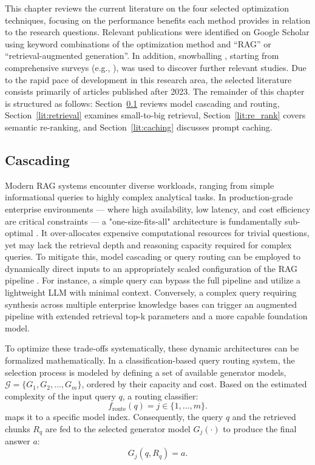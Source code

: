 This chapter reviews the current literature on the four selected optimization techniques, focusing on the performance benefits each method provides in relation to the research questions. Relevant publications were identified on Google Scholar using keyword combinations of the optimization method and ``RAG'' or ``retrieval-augmented generation''. In addition, snowballing \cite{guidelines}, starting from comprehensive surveys (e.g., \cite{gan2025rag, gao2023retrieval, wu2025ragnlp}), was used to discover further relevant studies. Due to the rapid pace of development in this research area, the selected literature consists primarily of articles published after 2023. The remainder of this chapter is structured as follows: Section~\ref{lit:cascading} reviews model cascading and routing, Section~\ref{lit:retrieval} examines small-to-big retrieval, Section~\ref{lit:re_rank} covers semantic re-ranking, and Section~\ref{lit:caching} discusses prompt caching.

\subsection{Cascading}
\label{lit:cascading}
Modern RAG systems encounter diverse workloads, ranging from simple informational queries to highly complex analytical tasks. In production-grade enterprise environments — where high availability, low latency, and cost efficiency are critical constraints — a "one-size-fits-all" architecture is fundamentally sub-optimal \cite{jeong2024adaptive, chen2023frugalgpt}. It over-allocates expensive computational resources for trivial questions, yet may lack the retrieval depth and reasoning capacity required for complex queries. To mitigate this, model cascading or query routing can be employed to dynamically direct inputs to an appropriately scaled configuration of the RAG pipeline \cite{ong2025routellm}. For instance, a simple query can bypass the full pipeline and utilize a lightweight LLM with minimal context. Conversely, a complex query requiring synthesis across multiple enterprise knowledge bases can trigger an augmented pipeline with extended retrieval top-k parameters and a more capable foundation model.

To optimize these trade-offs systematically, these dynamic architectures can be formalized mathematically. In a classification-based query routing system, the selection process is modeled by defining a set of available generator models, $\mathcal{G} = \{G_1, G_2, \ldots, G_m\}$, ordered by their capacity and cost. Based on the estimated complexity of the input query $q$, a routing classifier: 
\begin{equation}
    f_{\text{route}}(q) = j \in \{1, \ldots, m\}.
\end{equation}
maps it to a specific model index. Consequently, the query $q$ and the retrieved chunks $R_q$ are fed to the selected generator model $G_j(\cdot)$ to produce the final answer $a$:
\begin{equation}
G_j(q, R_q) = a.
\end{equation}

